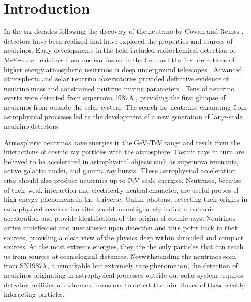 
\section{Introduction}
\label{sec:intro}

In the six decades following the 
discovery of the neutrino by Cowan and Reines \cite{reines1960detection}, detectors have been realized
that have explored the properties and sources of neutrinos. Early developments in the field included 
radiochemical detection of MeV-scale neutrinos from
nuclear fusion in the Sun \cite{Homestake} and the first detections of
higher energy
atmospheric neutrinos in deep underground telescopes
\cite{Achar,Witwatersrand}. Advanced
atmospheric and solar neutrino observatories provided definitive
evidence of neutrino mass and constrained neutrino mixing
parameters \cite{SK,SNO}. Tens of neutrino
events were detected from supernova 1987A
\cite{SK1987A,IMB1987A,BUST1987A}, providing the first glimpse of neutrinos
from outside the solar system. The search for neutrinos emanating from astrophysical
processes led to the development of a new generation of large-scale neutrino detectors. 

Atmospheric neutrinos have energies in the GeV--TeV range and result from the interactions of cosmic ray
particles with the atmosphere. Cosmic rays in turn are
believed to be accelerated in astrophysical objects such as supernova
remnants, active galactic nuclei, and gamma ray bursts. These
astrophysical acceleration sites should also produce neutrinos up to 
PeV-scale energies. Neutrinos, because of their weak interaction and electrically neutral character, are useful probes of high
energy phenomena in the Universe. Unlike photons, detecting their origins in astrophysical
acceleration sites would unambiguously indicate hadronic acceleration and
provide identification of the origins of cosmic rays. Neutrinos arrive 
undeflected and unscattered upon detection and thus point back to their
sources, providing
a clear view of the physics deep within shrouded and compact sources. At
the most extreme energies, they are the only particles that can reach 
us from sources at cosmological distances. Notwithstanding the neutrinos seen from SN1987A, a remarkable but
extremely rare phenomenon, the detection of neutrinos originating in
astrophysical processes outside our solar system requires detector facilities of
extreme dimensions to detect the faint fluxes of these weakly-interacting
particles. 

